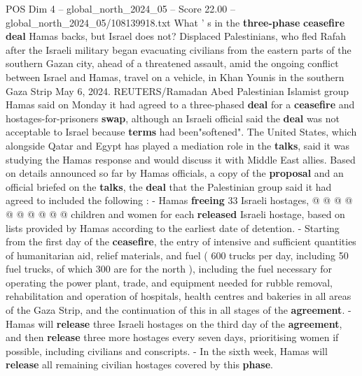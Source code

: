 \begin{textsample}{POS Dim 4 – global\_north\_2024\_05 – Score 22.00 – global\_north\_2024\_05/108139918.txt}  \label{ex:f4_pos_335}
What ' s in the \textbf{three-phase} \textbf{ceasefire} \textbf{deal} Hamas backs, but Israel does not?
Displaced Palestinians, who fled Rafah after the Israeli military began evacuating civilians from the eastern parts of the southern Gazan city, ahead of a threatened assault, amid the ongoing conflict between Israel and Hamas, travel on a vehicle, in Khan Younis in the southern Gaza Strip May 6, 2024.
REUTERS/Ramadan Abed Palestinian Islamist group Hamas said on Monday it had agreed to a three-phased \textbf{deal} for a \textbf{ceasefire} and hostages-for-prisoners \textbf{swap}, although an Israeli official said the \textbf{deal} was not acceptable to Israel because \textbf{terms} had been"softened".
The United States, which alongside Qatar and Egypt has played a mediation role in the \textbf{talks}, said it was studying the Hamas response and would discuss it with Middle East allies.
Based on details announced so far by Hamas officials, a copy of the \textbf{proposal} and an official briefed on the \textbf{talks}, the \textbf{deal} that the Palestinian group said it had agreed to included the following : - Hamas \textbf{freeing} 33 Israeli hostages, @ @ @ @ @ @ @ @ @ @ children and women for each \textbf{released} Israeli hostage, based on lists provided by Hamas according to the earliest date of detention. - Starting from the first day of the \textbf{ceasefire}, the entry of intensive and sufficient quantities of humanitarian aid, relief materials, and fuel ( 600 trucks per day, including 50 fuel trucks, of which 300 are for the north ), including the fuel necessary for operating the power plant, trade, and equipment needed for rubble removal, rehabilitation and operation of hospitals, health centres and bakeries in all areas of the Gaza Strip, and the continuation of this in all stages of the \textbf{agreement}. - Hamas will \textbf{release} three Israeli hostages on the third day of the \textbf{agreement}, and then \textbf{release} three more hostages every seven days, prioritising women if possible, including civilians and conscripts. - In the sixth week, Hamas will \textbf{release} all remaining civilian hostages covered by this \textbf{phase}.

\end{textsample}
